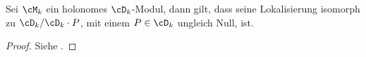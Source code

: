 \begin{thm}
Sei $\cM_k$ ein holonomes $\cD_k$-Modul, dann gilt, dass seine Lokalisierung
isomorph zu $\cD_k/\cD_k\cdot P$, mit einem $P\in \cD_k$ ungleich Null, ist.
\end{thm}
\begin{proof}
Siehe \cite[Cor 4.2.8]{sabbah_cimpa90}.
\end{proof}

\begin{comment}
\subsubsection{Alternative Definition B} %
\begin{defn} \cite[Def 3.3.1.]{sabbah_cimpa90}
Sei $\cM$ lineares Differentialsystem
(linear differential system) %
.  Man sagt, $\cM$ ist holonom, falls $\cM=0$ oder falls $\Car\cM\subset
\{x=0\}\cup{\xi=0}$.
\end{defn}
\begin{lem} \cite[Lem 3.3.8.]{sabbah_cimpa90}
Ein $\cD$-Modul ist holonom genau dann, wenn $\dim_{gr^F\cD,0}gr^F\cM=1$.
\end{lem}
\begin{proof}
Siehe \cite[Lem 3.3.8.]{sabbah_cimpa90}
\end{proof}
\end{comment}

\begin{comment}
\subsubsection{Alternative Definition A} %
\begin{defn}[Holonome $\cD$-Moduln]
\cite[Chap 10 §1]{coutinho1995primer}
Ein endlich generierter $\cD$-Modul $\cM$ ist \emph{holonom}, falls $\cM=0$
gilt, oder falls es die Dimension $1$ hat.
\end{defn}
\begin{bem}
\cite[Chap 10 §1]{coutinho1995primer}
Sei $\mathfrak{a}\neq 0$ ein Links-Ideal von $\cD$. Es gilt nach
\cite[Corollary 9.3.5]{coutinho1995primer}, dass $d(\cD/\mathfrak{a})\leq 1$.
Falls $\mathfrak{a}\neq\cD$, dann gilt nach der \emph{Bernstein's inequality}
\cite[Chap 9 §4]{coutinho1995primer}, dass $d(\cD/\mathfrak{a})=1$. Somit ist
$\cD/\mathfrak{a}$ ein holonomes $\cD$-Modul.
\end{bem}
\end{comment}

